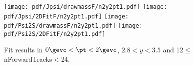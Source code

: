 \begin{figure}[H]
\begin{center}
\texttt{[image: pdf/Jpsi/drawmassF/n2y2pt1.pdf]}
\texttt{[image: pdf/Jpsi/2DFitF/n2y2pt1.pdf]}
\vspace*{-0.5cm}
\texttt{[image: pdf/Psi2S/drawmassF/n2y2pt1.pdf]}
\texttt{[image: pdf/Psi2S/2DFitF/n2y2pt1.pdf]}
\vspace*{-0.5cm}
\end{center}
\caption{Fit results in $0\gevc<\pt<2\gevc$, $2.8<y<3.5$ and 12$\leq$nForwardTracks$<$24.}
\label{Fitn2y2pt1}
\end{figure}

